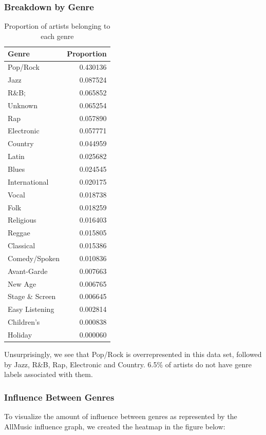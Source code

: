\subsubsection*{Breakdown by Genre}
\begin{table}[H]
\centering
\caption{Proportion of artists belonging to each genre}
\label{my-label}
\begin{tabular}{lr}
\hline
Genre &  Proportion \\
\hline
Pop/Rock       &    0.430136 \\
Jazz           &    0.087524 \\
R\&B;           &    0.065852 \\
Unknown        &    0.065254 \\
Rap            &    0.057890 \\
Electronic     &    0.057771 \\
Country        &    0.044959 \\
Latin          &    0.025682 \\
Blues          &    0.024545 \\
International  &    0.020175 \\
Vocal          &    0.018738 \\
Folk           &    0.018259 \\
Religious      &    0.016403 \\
Reggae         &    0.015805 \\
Classical      &    0.015386 \\
Comedy/Spoken  &    0.010836 \\
Avant-Garde    &    0.007663 \\
New Age        &    0.006765 \\
Stage \& Screen &    0.006645 \\
Easy Listening &    0.002814 \\
Children's     &    0.000838 \\
Holiday        &    0.000060 \\
\hline
\end{tabular}
\end{table}

Unsurprisingly, we see that Pop/Rock is overrepresented in this data set, followed by Jazz, R\&B, Rap, Electronic and Country. 6.5\% of artists do not have genre labels associated with them.

\subsubsection{Influence Between Genres}
To visualize the amount of influence between genres as represented by the AllMusic influence graph, we created the heatmap in the figure below:

